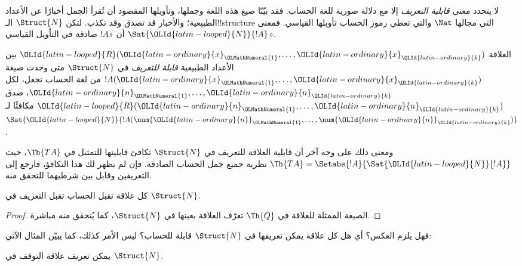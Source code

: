 \documentclass[../../../include/open-logic-section]{subfiles}
\begin{document}


لا يتحدد معنى \emph{قابلية التعريف} إلا مع دلالة صورية للغة
الحساب. فقد بيّنّا صيغ هذه اللغة وجملها، وتأويلها المقصود أن
تُقرأ الجمل أخبارًا عن الأعداد الطبيعية؛ والأخبار قد تصدق وقد
تكذب. لتكن $\Struct{N}$ الـ!!{structure} التي مجالها $\Nat$
والتي تعطي رموز الحساب تأويلها القياسي.
فمعنى $\Sat{{\OLId{latin-looped}{N}}}{!A}$ أن «$!A$ صادقة في التأويل القياسي».

\begin{defn}
العلاقة ${\OLId{latin-looped}{R}}({\OLId{latin-ordinary}{x}}_{\OLMathNumeral{1}},\dots,{\OLId{latin-ordinary}{x}}_{\OLId{latin-ordinary}{k}})$ بين الأعداد الطبيعية
\emph{قابلة للتعريف} في $\Struct{N}$ متى وجدت صيغة
$!A({\OLId{latin-ordinary}{x}}_{\OLMathNumeral{1}},\dots,{\OLId{latin-ordinary}{x}}_{\OLId{latin-ordinary}{k}})$ من لغة الحساب تجعل، لكل
${\OLId{latin-ordinary}{n}}_{\OLMathNumeral{1}},\dots,{\OLId{latin-ordinary}{n}}_{\OLId{latin-ordinary}{k}}$، صدق ${\OLId{latin-looped}{R}}({\OLId{latin-ordinary}{n}}_{\OLMathNumeral{1}},\dots,{\OLId{latin-ordinary}{n}}_{\OLId{latin-ordinary}{k}})$ مكافئًا لـ
$\Sat{{\OLId{latin-looped}{N}}}{!A(\num {\OLId{latin-ordinary}{n}}_{\OLMathNumeral{1}},\dots,\num {\OLId{latin-ordinary}{n}}_{\OLId{latin-ordinary}{k}})}$.
\end{defn}

ومعنى ذلك على وجه آخر أن قابلية العلاقة للتعريف في
$\Struct{N}$ تكافئ قابليتها للتمثيل في $\Th{TA}$،
حيث $\Th{TA} = \Setabs{!A}{\Sat{{\OLId{latin-looped}{N}}}{!A}}$ نظرية جميع جمل
الحساب الصادقة. فإن لم يظهر لك هذا التكافؤ، فارجع إلى التعريفين
وقابل بين شرطيهما للتحقق منه.

\begin{lem}
كل علاقة تقبل الحساب تقبل التعريف في $\Struct{N}$.
\end{lem}

\begin{proof}
الصيغة الممثلة للعلاقة في $\Th{Q}$ تعرّف العلاقة بعينها في
$\Struct{N}$، كما يُتحقق منه مباشرة.
\end{proof}

فهل يلزم العكس؟ أي هل كل علاقة يمكن تعريفها في $\Struct{N}$
قابلة للحساب؟ ليس الأمر كذلك، كما يبيّن المثال الآتي:

\begin{lem}
يمكن تعريف علاقة التوقف في $\Struct{N}$.
\end{lem}
\end{document}
